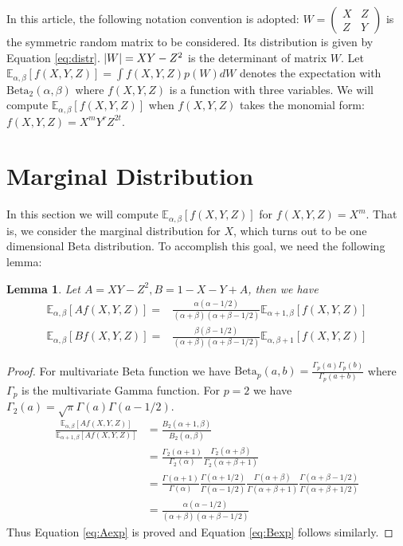 \documentclass[review,authoryear]{elsarticle}
\DeclarePairedDelimiter\abs{\lvert}{\rvert}
\def\E{\mathbb{E}}
\def\Beta{\textrm{Beta}}
\newtheorem{lemma}{Lemma}
\begin{document}
In this article, the following notation convention is adopted:
$W=\begin{pmatrix} X & Z \\ Z & Y \end{pmatrix}$ is the symmetric random
matrix to be considered. Its distribution is given by Equation \eqref{eq:distr}.
$\abs{W}=XY-Z^2$ is the determinant of matrix $W$.
Let $\E_{\alpha,\beta}[f(X,Y, Z)] = \int f(X,Y,Z)p(W)dW$ denotes the expectation
with $\Beta_2(\alpha, \beta)$ where $f(X, Y, Z)$ is a function with three
variables. We will compute $\E_{\alpha,\beta}[f(X,Y, Z)]$
when $f(X,Y,Z)$ takes the monomial form: $f(X,Y,Z)=X^m Y^r Z^{2t}$.

\section{Marginal Distribution}
In this section we will compute $\E_{\alpha,\beta}[f(X,Y, Z)]$
for $f(X,Y,Z)=X^m$. That is, we consider the marginal distribution for $X$,
which turns out to be one dimensional Beta distribution.
To accomplish this goal, we need the following lemma:
\begin{lemma}\label{lem:AB}
Let $A = XY - Z^2, B = 1 - X - Y + A$, then we have
\begin{align}
\E_{\alpha, \beta}[Af(X,Y,Z)] =&
\frac{\alpha(\alpha-1/2)}{(\alpha+\beta)(\alpha+\beta-1/2)}\E_{\alpha+1, \beta}[f(X,Y,Z)]
\label{eq:Aexp} \\
\E_{\alpha,\beta}[Bf(X,Y,Z)] =&
\frac{\beta(\beta-1/2)}{(\alpha+\beta)(\alpha+\beta-1/2)}\E_{\alpha, \beta+1}[f(X,Y,Z)]
\label{eq:Bexp}
\end{align}
\end{lemma}
\begin{proof}
For multivariate Beta function we have
$\Beta_p(a, b) = \frac{\Gamma_p(a)\Gamma_p(b)}{\Gamma_p(a+b)}$
where $\Gamma_p$ is the multivariate Gamma function.
For $p=2$ we have $\Gamma_2(a) = \sqrt{\pi}\Gamma(a)\Gamma(a-1/2)$.
\begin{align*}
\frac{\E_{\alpha, \beta}[Af(X,Y,Z)]}{\E_{\alpha+1, \beta}[Af(X,Y,Z)]} &
=\frac{B_2(\alpha+1,\beta)}{B_2(\alpha,\beta)}\\
&=\frac{\Gamma_2(\alpha+1)}{\Gamma_2(\alpha)}
\frac{\Gamma_2(\alpha+\beta)}{\Gamma_2(\alpha+\beta+1)}\\
& =\frac{\Gamma(\alpha+1)}{\Gamma(\alpha)}
\frac{\Gamma(\alpha+1/2)}{\Gamma(\alpha-1/2)}
\frac{\Gamma(\alpha+\beta)}{\Gamma(\alpha+\beta+1)}
\frac{\Gamma(\alpha+\beta-1/2)}{\Gamma(\alpha+\beta+1/2)}\\
&=\frac{\alpha(\alpha-1/2)}{(\alpha+\beta)(\alpha+\beta-1/2)}
\end{align*}
Thus Equation \eqref{eq:Aexp} is proved and Equation \eqref{eq:Bexp} follows similarly.
\end{proof}
\end{document}
